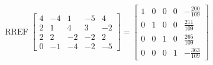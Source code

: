 \begin{exerciseAnswer} 


\[\operatorname{RREF} \left[\begin{array}{ccccc}
4 & -4 & 1 & -5 & 4 \\
2 & 1 & 4 & 3 & -2 \\
2 & 2 & -2 & -2 & 2 \\
0 & -1 & -4 & -2 & -5
\end{array}\right] = \left[\begin{array}{ccccc}
1 & 0 & 0 & 0 & -\frac{200}{109} \\
0 & 1 & 0 & 0 & \frac{211}{109} \\
0 & 0 & 1 & 0 & \frac{265}{109} \\
0 & 0 & 0 & 1 & -\frac{363}{109}
\end{array}\right] \]



\end{exerciseAnswer}
